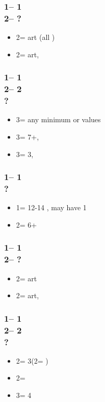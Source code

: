 \documentclass[12pt, a4paper]{article}
\begin{document}
\subsubsection*{1\diams -- 1\hearts\\
                2\diams -- ?}
\begin{itemize}
    \item 2\spades = \gf art (\then all \nat) \vimp
    \item 2\nt = \inv art, \fton{3\diams} \vimp
\end{itemize}

\subsubsection*{1\diams -- 1\hearts\\
                2\diams -- 2\nt \\ ?}
\begin{itemize}
    \item 3\clubs = any minimum or \clubs values
    \item 3\diams = 7+\diams, \gf
    \item 3\hearts = 3\hearts, \gf
\end{itemize}

\subsubsection*{1\diams -- 1\spades\\ ?}
\begin{itemize}
    \item 1\nt = 12-14 \bal, may have 1\spades
    \item 2\diams = 6+\diams
\end{itemize}

\subsubsection*{1\diams -- 1\spades\\
                2\diams -- ?}
\begin{itemize}
    \item 2\hearts = \gf art \vimp
    \item 2\nt = \inv art, \fton{3\diams} \vimp
\end{itemize}

\subsubsection*{1\diams -- 1\spades\\
                2\diams -- 2\hearts \\ ?}
\begin{itemize}
    \item 2\spades = 3\spades (2\nt = \lsf)
    \item 2\nt = \nat
    \item 3\clubs = 4\hearts \vimp
\end{itemize}
\end{document}
